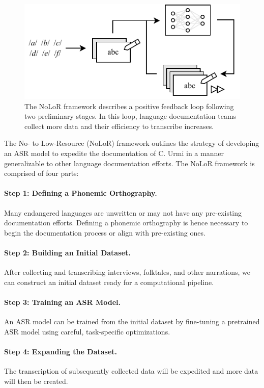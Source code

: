 \documentclass[letterpaper]{article} %
\begin{document}
\begin{figure}[t]
    \centering
    \includegraphics[width=\columnwidth]{cycle.pdf}
    \caption{The NoLoR framework describes a positive feedback loop following two preliminary stages. In this loop, language documentation teams collect more data and their efficiency to transcribe increases.}
    \label{cycle} 
\end{figure}

The No- to Low-Resource (NoLoR) framework outlines the strategy of developing an ASR model to expedite the documentation of C. Urmi in a manner generalizable to other language documentation efforts. The NoLoR framework is comprised of four parts:

\paragraph{Step 1: Defining a Phonemic Orthography.} Many endangered languages are unwritten or may not have any pre-existing documentation efforts. Defining a phonemic orthography is hence necessary to begin the documentation process or align with pre-existing ones.

\paragraph{Step 2: Building an Initial Dataset.} After collecting and transcribing interviews, folktales, and other narrations, we can construct an initial dataset ready for a computational pipeline.

\paragraph{Step 3: Training an ASR Model.} An ASR model can be trained from the initial dataset by fine-tuning a pretrained ASR model using careful, task-specific optimizations.

\paragraph{Step 4: Expanding the Dataset.} The transcription of subsequently collected data will be expedited and more data will then be created.
\end{document}
